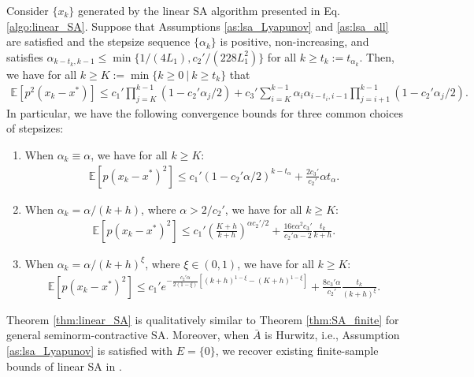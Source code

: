 \documentclass[11 pt]{article}
\begin{document}
	\begin{theorem}\label{thm:linear_SA}
		Consider $\{x_k\}$ generated by the linear SA algorithm presented in Eq. \eqref{algo:linear_SA}. Suppose that Assumptions \ref{as:lsa_Lyapunov} and \ref{as:lsa_all} are satisfied and the stepsize sequence $\{\alpha_k\}$ is positive, non-increasing, and satisfies $\alpha_{k-t_k, k-1} \leq \min\{1/(4L_1),c_2'/(228L_1^2)\}$ for all $k \geq t_k:=t_{\alpha_k}$.
		Then, we have for all $k\geq K:=\min\{k\geq 0 ~|~ k \geq t_k\}$ that 
		\begin{align*}
			\mathbb{E}[p^2(x_k-x^*)]
			\leq c_1'\prod_{j=K}^{k-1}\left(1-c_2'\alpha_j/2\right)+c_3'\sum_{i=K}^{k-1}\alpha_i\alpha_{i-t_i,i-1}\prod_{j=i+1}^{k-1}\left(1-c_2'\alpha_j/2\right).
		\end{align*}
		In particular, we have the following convergence bounds for three common choices of stepsizes:
		\begin{enumerate}[(1)]
			\item When $\alpha_k \equiv \alpha$, we have for all $k \geq K$:
			\begin{equation*}
				\begin{split}
					\mathbb{E}[p(x_{k}-x^*)^2] \leq c_1' \left(1-c_2'\alpha /2\right)^{k-t_\alpha} + \frac{2c_3'}{c_2'} \alpha t_\alpha.
				\end{split}
			\end{equation*}
			\item When $\alpha_k = \alpha/(k + h)$, where $\alpha > 2/c_2'$, we have for all $k \geq K$:
			\begin{align*}
				\mathbb{E}[p(x_{k}-x^*)^2] \leq c_1' \left(\frac{K+h}{k + h}\right)^{\alpha c_2'/2} + \frac{16e\alpha^2c_3'}{c_2'\alpha - 2} \frac{t_k}{k + h}.
			\end{align*}
			\item When $\alpha_k = \alpha/(k + h)^\xi$, where $\xi \in (0, 1)$, we have for all $k \geq K$:
			\begin{align*}
				\mathbb{E}[p(x_{k}-x^*)^2] \leq c_1' e^{-\frac{c_2' \alpha}{2(1-\xi)}\left[(k+h)^{1-\xi} - (K+h)^{1-\xi}\right]} + \frac{8c_3' \alpha}{c_2'} \frac{t_k}{(k + h)^\xi}.
			\end{align*} 
		\end{enumerate}
		
	\end{theorem}
	
	Theorem \ref{thm:linear_SA} is qualitatively similar to Theorem \ref{thm:SA_finite} for general seminorm-contractive SA. Moreover, when $\bar{A}$ is Hurwitz, i.e., Assumption \ref{as:lsa_Lyapunov} is satisfied with $E=\{0\}$, we recover existing finite-sample bounds of linear SA in \cite{srikant2019finite}.
	
\end{document}
